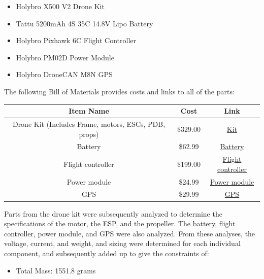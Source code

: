 \documentclass[11pt]{article}
\begin{document}
    \begin{itemize}
    \item Holybro X500 V2 Drone Kit
    \item Tattu 5200mAh 4S 35C 14.8V Lipo Battery
    \item Holybro Pixhawk 6C Flight Controller
    \item Holybro PM02D Power Module
    \item Holybro DroneCAN M8N GPS
    \end{itemize}
    \par
The following Bill of Materials provides costs and links to all of the parts:

\begin{center}
\begin{tabular}{ |c|c|c| } 
 \hline
 Item Name & Cost & Link\\ 
 
 \hline
 Drone Kit (Includes Frame, motors, ESCs, PDB, props)  & \$329.00 & \href{https://holybro.com/products/x500-v2-kits?variant=42541212041405}{Kit} \\
 
 Battery & \$62.99 & \href{https://genstattu.com/tattu-5200mah-14-8v-35c-4s1p-lipo-battery-pack-with-xt60-plug.html}{Battery} \\
 
 Flight controller & \$199.00 & \href{https://holybro.com/products/pixhawk-6c?variant=42420293501117}{Flight controller} \\
 
 Power module & \$24.99 & \href{https://holybro.com/products/pm02d-power-module }{Power module} \\
 
 GPS & \$29.99 & \href{https://holybro.com/products/dronecan-m8n-gps }{GPS}\\
 
 \hline
\end{tabular}
\end{center}

Parts from the drone kit were subsequently analyzed to determine the specifications of the motor, the ESP, and the propeller. The battery, flight controller, power module, and GPS were also analyzed. From these analyses, the voltage, current, and weight, and sizing were determined for each individual component, and subsequently added up to give the constraints of:
\begin{itemize}
    \item Total Mass: 1551.8 grams
\end{itemize}
\end{document}
